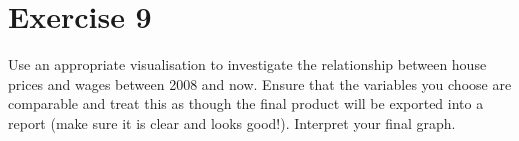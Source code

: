 \documentclass[
  letterpaper,
  DIV=11,
  numbers=noendperiod]{scrreprt}
\begin{document}
\section{Exercise 9}\label{exercise-9}

Use an appropriate visualisation to investigate the relationship between
house prices and wages between 2008 and now. Ensure that the variables
you choose are comparable and treat this as though the final product
will be exported into a report (make sure it is clear and looks good!).
Interpret your final graph.
\end{document}
